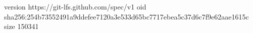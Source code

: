 version https://git-lfs.github.com/spec/v1
oid sha256:254b73552491a9ddefee7120a3e533d65bc7717ebea5c37d6c7f9e62aae1615c
size 150341
